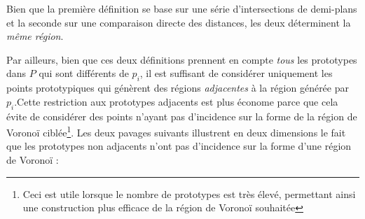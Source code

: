 \documentclass{article}
\begin{document}
Bien que la première définition se base sur une série d’intersections de demi-plans et
la seconde sur une comparaison directe des distances, les deux déterminent la \textit{même région}.

Par ailleurs, bien que ces deux définitions prennent en compte \textit{tous} les prototypes dans $P$ qui sont différents de $p_i$, il est suffisant de considérer uniquement les points prototypiques qui génèrent des régions \textit{adjacentes} à la région générée par $p_i$.Cette restriction aux prototypes adjacents est plus économe parce que cela évite de considérer des points n’ayant pas d’incidence sur la forme de la région de Voronoï ciblée\footnote{Ceci est utile lorsque le nombre de prototypes est très élevé, permettant ainsi une construction plus efficace de la région de Voronoï souhaitée}. Les deux pavages suivants illustrent en deux dimensions le fait que les prototypes non adjacents n’ont pas d’incidence sur la forme d’une région de Voronoï :
\end{document}
